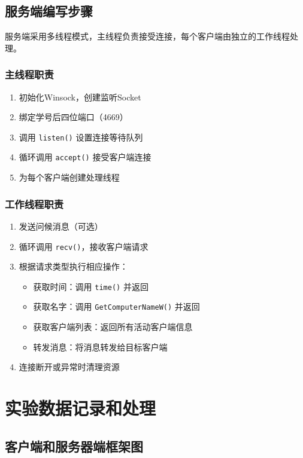 \documentclass[12pt,a4paper]{article}
\begin{document}
\subsection{服务端编写步骤}

服务端采用多线程模式，主线程负责接受连接，每个客户端由独立的工作线程处理。

\subsubsection{主线程职责}
\begin{enumerate}
    \item 初始化Winsock，创建监听Socket
    \item 绑定学号后四位端口（4669）
    \item 调用 \texttt{listen()} 设置连接等待队列
    \item 循环调用 \texttt{accept()} 接受客户端连接
    \item 为每个客户端创建处理线程
\end{enumerate}

\subsubsection{工作线程职责}
\begin{enumerate}
    \item 发送问候消息（可选）
    \item 循环调用 \texttt{recv()}，接收客户端请求
    \item 根据请求类型执行相应操作：
    \begin{itemize}
        \item 获取时间：调用 \texttt{time()} 并返回
        \item 获取名字：调用 \texttt{GetComputerNameW()} 并返回
        \item 获取客户端列表：返回所有活动客户端信息
        \item 转发消息：将消息转发给目标客户端
    \end{itemize}
    \item 连接断开或异常时清理资源
\end{enumerate}

\section{实验数据记录和处理}

\subsection{客户端和服务器端框架图}
\end{document}
